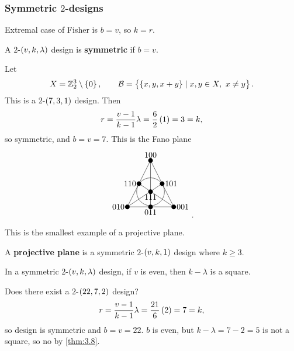 \subsubsection{Symmetric $ 2 $-designs}

Extremal case of Fisher is $ b = v $, so $ k = r $.

\begin{definition*}
A $ 2 $-$ \br{v, k, \lambda} $ design is \textbf{symmetric} if $ b = v $.
\end{definition*}

\begin{example*}
Let
$$ X = \Z_2^3 \setminus \cbr{0}, \qquad \BB = \cbr{\cbr{x, y, x + y} \mid x, y \in X, \ x \ne y}. $$
This is a $ 2 $-$ \br{7, 3, 1} $ design. Then
$$ r = \dfrac{v - 1}{k - 1}\lambda = \dfrac{6}{2}\br{1} = 3 = k, $$
so symmetric, and $ b = v = 7 $. This is the Fano plane
$$
\begin{tikzpicture}
\fill (0, 0) circle (0.1) node[above]{$ 100 $};
\fill (-0.5, -1) circle (0.1) node[left]{$ 110 $};
\fill (0.5, -1) circle (0.1) node[right]{$ 101 $};
\fill (0, -1.35) circle (0.1) node[below]{$ 111 $};
\fill (-1, -2) circle (0.1) node[left]{$ 010 $};
\fill (0, -2) circle (0.1) node[below]{$ 011 $};
\fill (1, -2) circle (0.1) node[right]{$ 001 $};
\draw (0, 0) to (-1, -2);
\draw (0, 0) to (0, -2);
\draw (0, 0) to (1, -2);
\draw (-0.5, -1) to (1, -2);
\draw (0.5, -1) to (-1, -2);
\draw (-1, -2) to (1, -2);
\draw (0, -1.35) circle (0.6);
\end{tikzpicture}.
$$
\end{example*}

\begin{note*}
This is the smallest example of a projective plane.
\end{note*}

\begin{definition*}
A \textbf{projective plane} is a symmetric $ 2 $-$ \br{v, k, 1} $ design where $ k \ge 3 $.
\end{definition*}

\begin{theorem}
\label{thm:3.8}
In a symmetric $ 2 $-$ \br{v, k, \lambda} $ design, if $ v $ is even, then $ k - \lambda $ is a square.
\end{theorem}

\begin{example*}
Does there exist a $ 2 $-$ \br{22, 7, 2} $ design?
$$ r = \dfrac{v - 1}{k - 1}\lambda = \dfrac{21}{6}\br{2} = 7 = k, $$
so design is symmetric and $ b = v = 22 $. $ b $ is even, but $ k - \lambda = 7 - 2 = 5 $ is not a square, so no by \ref{thm:3.8}.
\end{example*}

